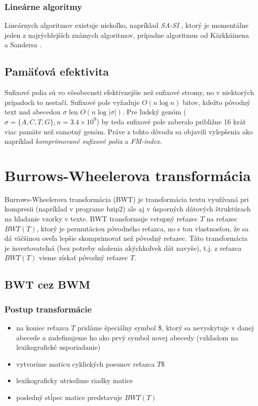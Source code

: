     \subsubsection{Lineárne algoritmy}
    Lineárnych algoritmov existuje niekoľko, napríklad \emph{SA-SI} \cite{NZC09}, ktorý je momentálne jeden z najrýchlejších známych algoritmov, prípadne algoritmus od Kärkkäinena a Sandersa \cite{KS03}.
        
    
    \subsection{Pamäťová efektivita}
    Sufixové polia sú vo všeobecnsti efektívnejšie než sufixové stromy, no v
    niektorých prípadoch to nestačí. Sufixové pole vyžaduje $O(n \log{n})$
    bitov, kdežto pôvodný text nad abecedou $\sigma$ len $O(n
    \log{\lvert \sigma \rvert})$. Pre ľudský genóm ($\sigma = \{A, C, T, G\}, n
    = 3.4 \times 10^9$) by teda sufixové pole zaberalo približne 16 krát viac
    pamäte než samotný genóm. Práve z tohto dôvodu sa objavili vylepšenia ako
    napríklad \textit{komprimované sufixové polia} a \textit{FM-index}.
    

\section{Burrows-Wheelerova transformácia}
    Burrows-Wheelerova transformácia (BWT) je transformácia textu využívaná pri
    kompresii (napríklad v programe bzip2) ale aj v úsporných dátových
    štruktúrach na hľadanie vzorky v texte. BWT transformuje vstupný reťazec $T$
    na reťazec $BWT(T)$, ktorý je permutáciou pôvodného reťazca, no s tou
    vlastnosťou, že sa dá väčšinou oveľa lepšie skomprimovať než pôvodný
    reťazec. Táto transformácia je invertovateľná (bez potreby uloženia
    akýchkoľvek dát navyše), t.j. z reťazca $BWT(T)$ vieme získať pôvodný reťazec
    $T$.
    
    \subsection{BWT cez BWM}
    \subsubsection*{Postup transformácie}
    \begin{itemize}
        \item na koniec reťazca $T$ pridáme špeciálny symbol \$, ktorý sa
        nevyskytuje v danej abecede a zadefinujeme ho ako prvý symbol novej
        abecedy (vzhľadom na lexikografické usporiadanie)
        \item vytvoríme maticu cyklických posunov reťazca $T\$$
        \item lexikograficky utriedime riadky matice
        \item posledný stĺpec matice predstavuje $BWT(T)$
    \end{itemize}
    
